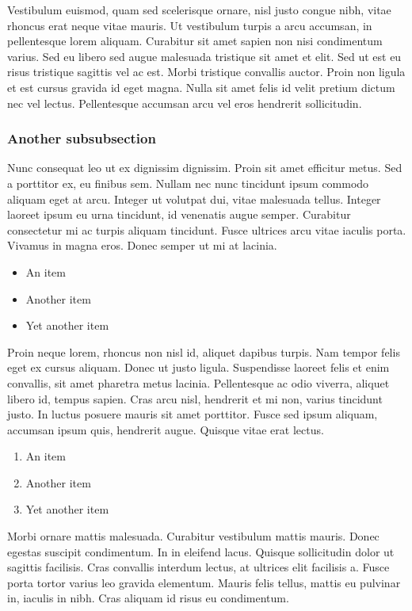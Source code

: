 \documentclass{abe}
\begin{document}
Vestibulum euismod, quam sed scelerisque ornare, nisl justo congue nibh, vitae rhoncus erat neque vitae mauris. Ut vestibulum turpis a arcu accumsan, in pellentesque lorem aliquam. Curabitur sit amet sapien non nisi condimentum varius. Sed eu libero sed augue malesuada tristique sit amet et elit. Sed ut est eu risus tristique sagittis vel ac est. Morbi tristique convallis auctor. Proin non ligula et est cursus gravida id eget magna. Nulla sit amet felis id velit pretium dictum nec vel lectus. Pellentesque accumsan arcu vel eros hendrerit sollicitudin. 

\subsubsection{Another subsubsection}
Nunc consequat leo ut ex dignissim dignissim. Proin sit amet efficitur metus. Sed a porttitor ex, eu finibus sem. Nullam nec nunc tincidunt ipsum commodo aliquam eget at arcu. Integer ut volutpat dui, vitae malesuada tellus. Integer laoreet ipsum eu urna tincidunt, id venenatis augue semper. Curabitur consectetur mi ac turpis aliquam tincidunt. Fusce ultrices arcu vitae iaculis porta. Vivamus in magna eros. Donec semper ut mi at lacinia.

\begin{itemize}
\item An item
\item Another item
\item Yet another item
\end{itemize}

Proin neque lorem, rhoncus non nisl id, aliquet dapibus turpis. Nam tempor felis eget ex cursus aliquam. Donec ut justo ligula. Suspendisse laoreet felis et enim convallis, sit amet pharetra metus lacinia. Pellentesque ac odio viverra, aliquet libero id, tempus sapien. Cras arcu nisl, hendrerit et mi non, varius tincidunt justo. In luctus posuere mauris sit amet porttitor. Fusce sed ipsum aliquam, accumsan ipsum quis, hendrerit augue. Quisque vitae erat lectus.

\begin{enumerate}
\item An item
\item Another item
\item Yet another item
\end{enumerate}

Morbi ornare mattis malesuada. Curabitur vestibulum mattis mauris. Donec egestas suscipit condimentum. In in eleifend lacus. Quisque sollicitudin dolor ut sagittis facilisis. Cras convallis interdum lectus, at ultrices elit facilisis a. Fusce porta tortor varius leo gravida elementum. Mauris felis tellus, mattis eu pulvinar in, iaculis in nibh. Cras aliquam id risus eu condimentum.
\end{document}
